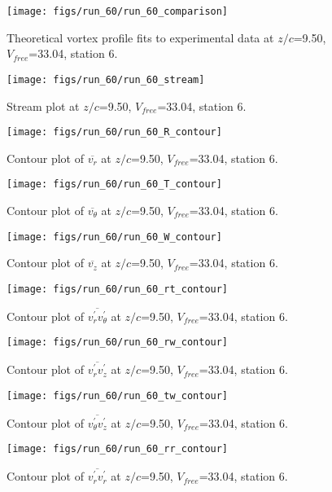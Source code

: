 \begin{figure}[H]
\centering
\texttt{[image: figs/run\_60/run\_60\_comparison]}
\caption{Theoretical vortex profile fits to experimental data at $z/c$=9.50, $V_{free}$=33.04, station 6.}
\end{figure}


\begin{figure}[H]
\centering
\texttt{[image: figs/run\_60/run\_60\_stream]}
\caption{Stream plot at $z/c$=9.50, $V_{free}$=33.04, station 6.}
\end{figure}


\begin{figure}[H]
\centering
\texttt{[image: figs/run\_60/run\_60\_R\_contour]}
\caption{Contour plot of $\overline{v_{r}}$ at $z/c$=9.50, $V_{free}$=33.04, station 6.}
\end{figure}


\begin{figure}[H]
\centering
\texttt{[image: figs/run\_60/run\_60\_T\_contour]}
\caption{Contour plot of $\overline{v_{\theta}}$ at $z/c$=9.50, $V_{free}$=33.04, station 6.}
\end{figure}


\begin{figure}[H]
\centering
\texttt{[image: figs/run\_60/run\_60\_W\_contour]}
\caption{Contour plot of $\overline{v_{z}}$ at $z/c$=9.50, $V_{free}$=33.04, station 6.}
\end{figure}


\begin{figure}[H]
\centering
\texttt{[image: figs/run\_60/run\_60\_rt\_contour]}
\caption{Contour plot of $\overline{v_{r}^{\prime} v_{\theta}^{\prime}}$ at $z/c$=9.50, $V_{free}$=33.04, station 6.}
\end{figure}


\begin{figure}[H]
\centering
\texttt{[image: figs/run\_60/run\_60\_rw\_contour]}
\caption{Contour plot of $\overline{v_{r}^{\prime} v_{z}^{\prime}}$ at $z/c$=9.50, $V_{free}$=33.04, station 6.}
\end{figure}


\begin{figure}[H]
\centering
\texttt{[image: figs/run\_60/run\_60\_tw\_contour]}
\caption{Contour plot of $\overline{v_{\theta}^{\prime} v_{z}^{\prime}}$ at $z/c$=9.50, $V_{free}$=33.04, station 6.}
\end{figure}


\begin{figure}[H]
\centering
\texttt{[image: figs/run\_60/run\_60\_rr\_contour]}
\caption{Contour plot of $\overline{v_{r}^{\prime} v_{r}^{\prime}}$ at $z/c$=9.50, $V_{free}$=33.04, station 6.}
\end{figure}


